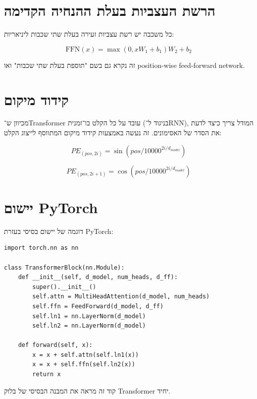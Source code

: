 \section{הרשת העצביות בעלת ההנחיה הקדימה}

כל משכבה יש רשת עצביות זעירה בעלת שתי שכבות ליניאריות:

\begin{equation}
\text{FFN}(x) = \max(0, xW_1 + b_1)W_2 + b_2
\end{equation}

זה נקרא גם בשם "תוספת בעלת שתי שכבות" ואו \textenglish{position-wise feed-forward network}.

\section{קידוד מיקום}

מכיוון ש־\textenglish{Transformer} עובד על כל הקלט בו־זמנית (בניגוד ל־\textenglish{RNN}),
המודל צריך כיצד לדעת את הסדר של האסימונים.
זה נעשה באמצעות קידוד מיקום המתווסף לייצוג הקלט:

\begin{equation}
PE_{(pos, 2i)} = \sin(pos / 10000^{2i/d_{model}})
\end{equation}

\begin{equation}
PE_{(pos, 2i+1)} = \cos(pos / 10000^{2i/d_{model}})
\end{equation}

\section{יישום \textenglish{PyTorch}}

דוגמה של יישום בסיסי בעזרת \textenglish{PyTorch}:

\begin{LTR}
\begin{verbatim}
import torch.nn as nn

class TransformerBlock(nn.Module):
    def __init__(self, d_model, num_heads, d_ff):
        super().__init__()
        self.attn = MultiHeadAttention(d_model, num_heads)
        self.ffn = FeedForward(d_model, d_ff)
        self.ln1 = nn.LayerNorm(d_model)
        self.ln2 = nn.LayerNorm(d_model)
    
    def forward(self, x):
        x = x + self.attn(self.ln1(x))
        x = x + self.ffn(self.ln2(x))
        return x
\end{verbatim}
\end{LTR}

קוד זה מראה את המבנה הבסיסי של בלוק \textenglish{Transformer} יחיד.
